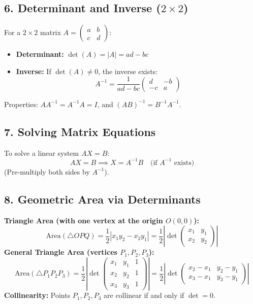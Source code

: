 \subsection*{6. Determinant and Inverse ($2 \times 2$)}
For a $2 \times 2$ matrix $A = \begin{pmatrix} a & b \\ c & d \end{pmatrix}$:
\begin{itemize}
    \item \textbf{Determinant:} $\det(A) = |A| = ad - bc$
    \item \textbf{Inverse:} If $\det(A) \neq 0$, the inverse exists:
    \[
    A^{-1} = \frac{1}{ad - bc} \begin{pmatrix} d & -b \\ -c & a \end{pmatrix}
    \]
\end{itemize}
Properties: $A A^{-1} = A^{-1} A = I$, and $(AB)^{-1} = B^{-1} A^{-1}$.

\subsection*{7. Solving Matrix Equations}
To solve a linear system $AX = B$:
\[
AX = B \implies X = A^{-1} B \quad \text{(if } A^{-1} \text{ exists)}
\]
(Pre-multiply both sides by $A^{-1}$).

\subsection*{8. Geometric Area via Determinants}
\textbf{Triangle Area (with one vertex at the origin $O(0,0)$):}
\[
\text{Area}(\triangle OPQ) = \frac{1}{2} |x_1 y_2 - x_2 y_1| = \frac{1}{2} \left| \det \begin{pmatrix} x_1 & y_1 \\ x_2 & y_2 \end{pmatrix} \right|
\]
\textbf{General Triangle Area (vertices $P_1, P_2, P_3$):}
\[
\text{Area}(\triangle P_1 P_2 P_3) = \frac{1}{2} \left| \det \begin{pmatrix} x_1 & y_1 & 1 \\ x_2 & y_2 & 1 \\ x_3 & y_3 & 1 \end{pmatrix} \right| = \frac{1}{2} \left| \det \begin{pmatrix} x_2 - x_1 & y_2 - y_1 \\ x_3 - x_1 & y_3 - y_1 \end{pmatrix} \right|
\]
\textbf{Collinearity:} Points $P_1, P_2, P_3$ are collinear if and only if $\det = 0$.

